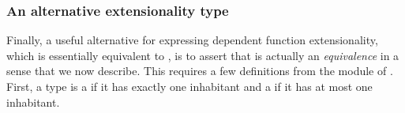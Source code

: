 \subsubsection{An alternative extensionality type}\label{alternative-extensionality-type}
Finally, a useful alternative for expressing dependent function extensionality, which is essentially equivalent to , is to assert that  is actually an \emph{equivalence} in a sense that we now describe. This requires a few definitions from the  module of \typtop. First, a type is a  if it has exactly one inhabitant and a  if it has at most one inhabitant.
\ccpad
\begin{code}%
\>[1]\AgdaSpace{}%
\AgdaSymbol{:}\AgdaSpace{}%
\AgdaSymbol{(}\AgdaSpace{}%
\AgdaSymbol{:}\AgdaSpace{}%
\AgdaSpace{}%
\AgdaSpace{}%
\AgdaSymbol{)}\AgdaSpace{}%
\AgdaSpace{}%
\AgdaSpace{}%
\AgdaSpace{}%
\AgdaSpace{}%
\<%
\\
%
\>[1]\AgdaSpace{}%
\AgdaSpace{}%
\AgdaSpace{}%
\AgdaSymbol{=}\AgdaSpace{}%
\AgdaSymbol{(}\AgdaSpace{}%
\AgdaSymbol{:}\AgdaSpace{}%
\AgdaSymbol{)}\AgdaSpace{}%
\AgdaSpace{}%
\AgdaSpace{}%
\AgdaSpace{}%
\<%
\end{code}
\scpad
\begin{code}
\>[1]\AgdaSpace{}%
\AgdaSymbol{:}\AgdaSpace{}%
\AgdaSpace{}%
\AgdaSpace{}%
\AgdaSpace{}%
\AgdaSpace{}%
\<%
\\
%
\>[1]\AgdaSpace{}%
\AgdaSpace{}%
\AgdaSymbol{=}\AgdaSpace{}%
\AgdaSpace{}%
\AgdaSpace{}%
\AgdaSpace{}%
\AgdaSpace{}%
\AgdaFunction{,}\AgdaSpace{}%
\AgdaSpace{}%
\AgdaSpace{}%
\<%
\end{code}
\scpad
\begin{code}
\>[1]\AgdaSpace{}%
\AgdaSymbol{:}\AgdaSpace{}%
\AgdaSpace{}%
\AgdaSpace{}%
\AgdaSpace{}%
\AgdaSpace{}%
\<%
\\
%
\>[1]\AgdaSpace{}%
\AgdaSpace{}%
\AgdaSymbol{=}\AgdaSpace{}%
\AgdaSymbol{(}\AgdaSpace{}%
\AgdaSpace{}%
\AgdaSymbol{:}\AgdaSpace{}%
\AgdaSymbol{)}\AgdaSpace{}%
\AgdaSpace{}%
\AgdaSpace{}%
\AgdaSpace{}%
\<%
\end{code}
